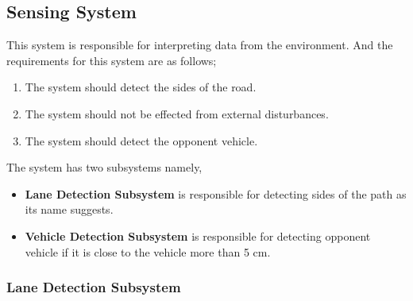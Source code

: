 \documentclass[a4paper,12pt]{article}
\begin{document}




\subsection{Sensing System}


This system is responsible for interpreting data from the environment. And the requirements for this system are as follows;

\begin{enumerate}

\item The system should detect the sides of the road.

\item The system should not be effected from external disturbances.

\item The system should detect the opponent vehicle.

\end{enumerate}	

\noindent The system has two subsystems namely, 


\begin{itemize}

\item \textbf{Lane Detection Subsystem} is responsible for detecting sides of the path as its name suggests.

\item \textbf{Vehicle Detection Subsystem} is responsible for detecting opponent vehicle if it is close to the vehicle more than 5 cm.

\end{itemize}



\subsubsection{Lane Detection Subsystem}\label{sec:LaneDetectionSubsystem}
\end{document}
